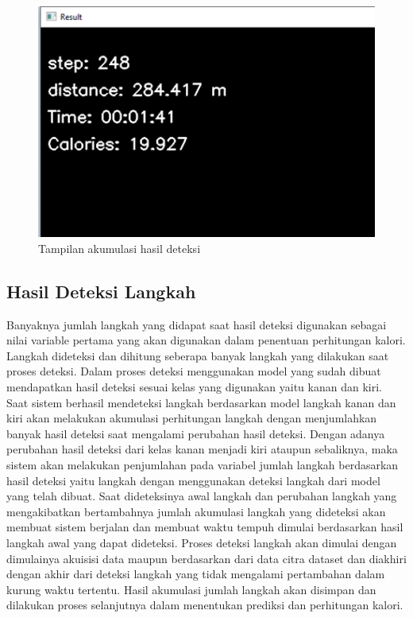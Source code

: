\begin{figure}[H]
  \centering
  \includegraphics[scale=0.7]{gambar/hasil deteksi2.png}
  \caption{Tampilan akumulasi hasil deteksi}
  \label{fig:HasilDeteksi2}
\end{figure}

\subsection{Hasil Deteksi Langkah}
\label{subsec:HasilLangkah}

Banyaknya jumlah langkah yang didapat saat hasil deteksi digunakan sebagai nilai variable pertama yang akan digunakan dalam penentuan perhitungan kalori. Langkah dideteksi dan dihitung seberapa banyak langkah yang dilakukan saat proses deteksi. Dalam proses deteksi menggunakan model yang sudah dibuat mendapatkan hasil deteksi sesuai kelas yang digunakan yaitu kanan dan kiri. Saat sistem berhasil mendeteksi langkah berdasarkan model langkah kanan dan kiri akan melakukan akumulasi perhitungan langkah dengan menjumlahkan banyak hasil deteksi saat mengalami perubahan hasil deteksi. Dengan adanya perubahan hasil deteksi dari kelas kanan menjadi kiri ataupun sebaliknya, maka sistem akan melakukan penjumlahan pada variabel jumlah langkah berdasarkan hasil deteksi yaitu langkah dengan menggunakan deteksi langkah dari model yang telah dibuat. Saat dideteksinya awal langkah dan perubahan langkah yang mengakibatkan bertambahnya jumlah akumulasi langkah yang dideteksi akan membuat sistem berjalan dan membuat waktu tempuh dimulai berdasarkan hasil langkah awal yang dapat dideteksi. Proses deteksi langkah akan dimulai dengan dimulainya akuisisi data maupun berdasarkan dari data citra dataset dan diakhiri dengan akhir dari deteksi langkah yang tidak mengalami pertambahan dalam kurung waktu tertentu. Hasil akumulasi jumlah langkah akan disimpan dan dilakukan proses selanjutnya dalam menentukan prediksi dan perhitungan kalori.


